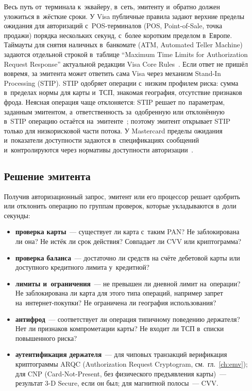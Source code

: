 Весь путь от~терминала к~эквайеру, в~сеть, эмитенту и~обратно должен уложиться
в~жёсткие сроки. У Visa публичные правила задают верхние пределы ожидания для
авторизаций с~POS-терминалов (POS, Point-of-Sale, точка продажи) порядка
нескольких секунд, с~более коротким пределом в~Европе. Таймауты для снятия
наличных в~банкомате (ATM, Automated Teller Machine) задаются отдельной строкой
в~таблице \enquote{Maximum Time Limits for Authorization Request Response}
актуальной редакции Visa Core Rules~\cite{visa-core-rules}. Если ответ не
пришёл вовремя, за эмитента может ответить сама Visa через механизм Stand-In
Processing (STIP). STIP одобряет операции с~низким профилем риска: сумма
в~пределах нормы для карты и~ТСП, знакомая география, отсутствие признаков
фрода. Неясная операция чаще отклоняется: STIP решает по~параметрам, заданным
эмитентом, а~ответственность за~одобренную или отклонённую в~STIP операцию
остаётся на~эмитенте~\cite{visa-core-rules}; поэтому эмитент открывает STIP
только для низкорисковой части потока. У Mastercard
пределы ожидания и~показатели доступности задаются в~спецификациях сообщений
и~контролируются через нормативы доступности
авторизации~\cite{visa-core-rules,mc-tpr}.

\subsection*{Решение эмитента}

Получив авторизационный запрос, эмитент или его процессор решает одобрить или
отклонить операцию по группам проверок, которые укладываются в~доли секунды:

\begin{itemize}
  \item \textbf{проверка карты}~--- существует ли карта с~таким PAN? Не
    заблокирована ли она? Не истёк ли срок действия? Совпадает ли CVV или
    криптограмма?
  \item \textbf{проверка баланса}~--- достаточно ли средств на счёте дебетовой
    карты или доступного кредитного лимита у~кредитной?
  \item \textbf{лимиты и~ограничения}~--- не превышен ли дневной лимит
    на~операции? Не заблокирована ли карта для этого типа операций,
    например запрет на~интернет-покупки? Не ограничена ли география
    использования?
  \item \textbf{антифрод}~--- соответствует ли операция типичному поведению
    держателя? Нет ли признаков компрометации карты? Не входит ли ТСП
    в~списки повышенного риска?
  \item \textbf{аутентификация держателя}~--- для чиповых транзакций верификация
    криптограммы ARQC (Authorization Request Cryptogram,
    см.~гл.~\ref{ch:emv}); для CNP (Card-Not-Present, без физического
    предъявления карты)~--- результат 3-D Secure, если он был; для
    магнитной полосы~--- CVV.
\end{itemize}

